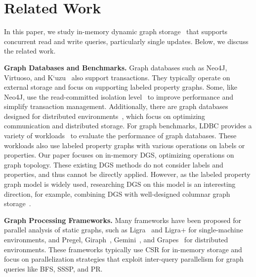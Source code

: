 \section{Related Work} \label{sec:related_work}

In this paper, we study in-memory dynamic graph storage~\cite{macko2015llama, zhu2019livegraph, de2021teseo, dhulipala2019low, fuchs2022sortledton} that supports concurrent read and write queries, particularly single updates. Below, we discuss the related work.

\noindent\textbf{Graph Databases and Benchmarks.} Graph databases such as Neo4J, Virtuoso, and K`uzu~\cite{kuzu:cidr} also support transactions. They typically operate on external storage and focus on supporting labeled property graphs. Some, like Neo4J, use the read-committed isolation level~\cite{ramakrishnan2002database} to improve performance and simplify transaction management. Additionally, there are graph databases designed for distributed environments~\cite{li2022bytegraph,zhang2024bg3,besta2023graph,carter2019nanosecond}, which focus on optimizing communication and distributed storage. For graph benchmarks, LDBC provides a variety of workloads~\cite{erling2015ldbc,szarnyas2022ldbc,iosup2016ldbc} to evaluate the performance of graph databases. These workloads also use labeled property graphs with various operations on labels or properties. Our paper focuses on in-memory DGS, optimizing operations on graph topology. These existing DGS methods do not consider labels and properties, and thus cannot be directly applied. However, as the labeled property graph model is widely used, researching DGS on this model is an interesting direction, for example, combining DGS with well-designed columnar graph storage~\cite{mhedhbi2021a+}.

\noindent\textbf{Graph Processing Frameworks.} Many frameworks have been proposed for parallel analysis of static graphs, such as Ligra~\cite{shun2013ligra} and Ligra+\cite{shun2015smaller} for single-machine environments, and Pregel\cite{malewicz2010pregel}, Giraph~\cite{grover2015hadoop}, Gemini~\cite{zhu2016gemini}, and Grapes~\cite{fan2018parallelizing} for distributed environments. These frameworks typically use CSR for in-memory storage and focus on parallelization strategies that exploit inter-query parallelism for graph queries like BFS, SSSP, and PR.

